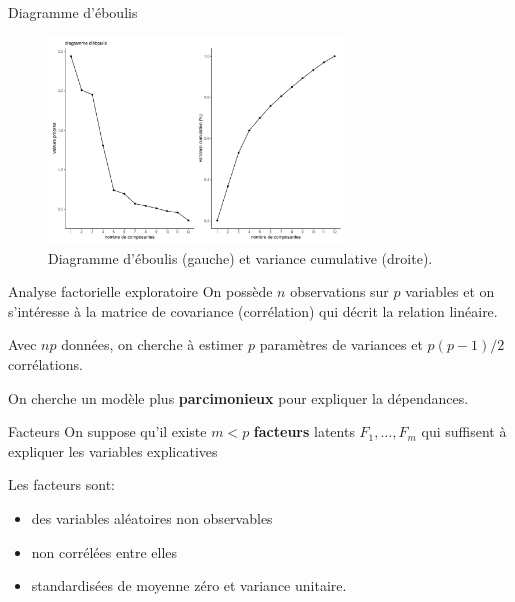 \documentclass[
  ignorenonframetext,
]{beamer}
\providecommand{\tightlist}{%
  \setlength{\itemsep}{0pt}\setlength{\parskip}{0pt}}\usepackage{longtable,booktabs,array}
\begin{document}
\begin{frame}{Diagramme d'éboulis}
\protect\hypertarget{diagramme-duxe9boulis}{}
\begin{figure}

{\centering \includegraphics[width=0.7\textwidth,height=\textheight]{MATH60602-diapos3_files/figure-beamer/fig-screeplot-1.pdf}

}

\caption{\label{fig-screeplot}Diagramme d'éboulis (gauche) et variance
cumulative (droite).}

\end{figure}
\end{frame}

\begin{frame}{Analyse factorielle exploratoire}
\protect\hypertarget{analyse-factorielle-exploratoire-1}{}
On possède \(n\) observations sur \(p\) variables et on s'intéresse à la
matrice de covariance (corrélation) qui décrit la relation linéaire.

Avec \(np\) données, on cherche à estimer \(p\) paramètres de variances
et \(p(p-1)/2\) corrélations.

On cherche un modèle plus \textbf{parcimonieux} pour expliquer la
dépendances.
\end{frame}

\begin{frame}{Facteurs}
\protect\hypertarget{facteurs}{}
On suppose qu'il existe \(m < p\) \textbf{facteurs} latents
\(F_1, \ldots, F_m\) qui suffisent à expliquer les variables
explicatives

Les facteurs sont:

\begin{itemize}
\tightlist
\item
  des variables aléatoires non observables
\item
  non corrélées entre elles
\item
  standardisées de moyenne zéro et variance unitaire.
\end{itemize}
\end{frame}
\end{document}
